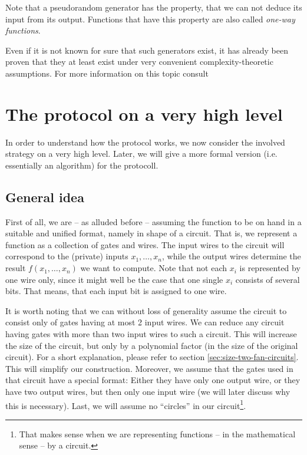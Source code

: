 \message{ !name(seminar.tex)}\documentclass{llncs}
\begin{document}
Note that a pseudorandom generator has the property, that we can not deduce its input from its output. Functions that have this property are also called \emph{one-way functions}.

Even if it is not known for sure that such generators exist, it has already been proven that they at least exist under very convenient complexity-theoretic assumptions. For more information on this topic consult \cite{pseudorandom-generators-blum,pseudorandom-generators-yao}

\section{The protocol on a very high level}
\label{sec:high-level-description}

In order to understand how the protocol works, we now consider the involved strategy on a very high level. Later, we will give a more formal version (i.e. essentially an algorithm) for the protocoll.

\subsection{General idea}
\label{sec:general-idea}

First of all, we are -- as alluded before -- assuming the function to be on hand in a suitable and unified format, namely in shape of a circuit. That is, we represent a function as a collection of gates and wires. The input wires to the circuit will correspond to the (private) inputs $x_1,\dots,x_n$, while the output wires determine the result $f(x_1,\dots,x_n)$ we want to compute. Note that not each $x_i$ is represented by one wire only, since it might well be the case that one single $x_i$ consists of several bits. That means, that each input bit is assigned to one wire.

It is worth noting that we can without loss of generality assume the circuit to consist only of gates having at most 2 input wires. We can reduce any circuit having gates with more than two input wires to such a circuit. This will increase the size of the circuit, but only by a polynomial factor (in the size of the original circuit). For a short explanation, please refer to section \ref{sec:size-two-fan-circuits}. This will simplify our construction. Moreover, we assume that the gates used in that circuit have a special format: Either they have only one output wire, or they have two output wires, but then only one input wire (we will later discuss why this is necessary). Last, we will assume no ``circles'' in our circuit\footnote{That makes sense when we are representing functions -- in the mathematical sense -- by a circuit.}.
\end{document}
